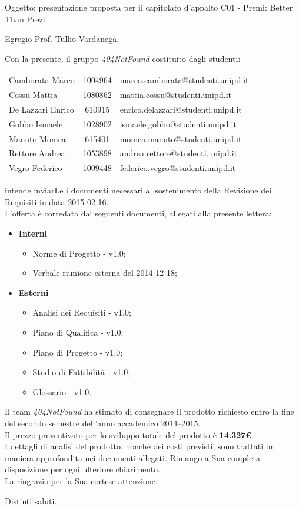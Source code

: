 \documentclass[a4paper,10pt]{letter}
\newcommand{\gruppo}{404NotFound}
\newcommand{\premi}{Premi: Better Than Prezi}
\newcommand{\Vardanega}{Prof. Tullio Vardanega}
\newcommand{\VeFe}{Vegro Federico}
\newcommand{\CaMa}{Camborata Marco}
\newcommand{\GoIs}{Gobbo Ismaele}
\newcommand{\DeEn}{De Lazzari Enrico}
\newcommand{\CoMa}{Cossu Mattia}
\newcommand{\ReAn}{Rettore Andrea}
\newcommand{\MaMo}{Manuto Monica}
\begin{document}
	
	\begin{letter}{Oggetto: presentazione proposta per il capitolato d'appalto  C01 - \premi.}
	\opening {Egregio \Vardanega ,}
	Con la presente, il gruppo \textit{\gruppo} costituito dagli studenti: 
		\begin{center}
		\begin{tabular}{l c l c}					
		\CaMa & 1004964 & marco.camborata@studenti.unipd.it \\
		\CoMa & 1080862 & mattia.cossu@studenti.unipd.it\\
		\DeEn & 610915  & enrico.delazzari@studenti.unipd.it\\ 
		\GoIs & 1028902 & ismaele.gobbo@studenti.unipd.it\\
		\MaMo & 615401  & monica.manuto@studenti.unipd.it\\
		\ReAn & 1053898 & andrea.rettore@studenti.unipd.it\\
		\VeFe & 1009448 & federico.vegro@studenti.unipd.it\\
		\end{tabular}
		\end{center}
	intende inviarLe i documenti necessari al sostenimento della Revisione dei Requisiti in data 2015-02-16.\\
    L'offerta è corredata dai seguenti documenti, allegati alla presente lettera:
			\begin{itemize}
				\item \textbf{Interni}
					\begin{itemize}
						\item Norme di Progetto - v1.0;
						\item Verbale riunione esterna del 2014-12-18;
					\end{itemize}
				\item \textbf{Esterni}
					\begin{itemize}
						\item Analisi dei Requisiti - v1.0;
						\item Piano di Qualifica - v1.0;
						\item Piano di Progetto - v1.0;
						\item Studio di Fattibilità - v1.0;
						\item Glossario - v1.0.
					\end{itemize}
			\end{itemize} 
		Il team \textit{\gruppo} ha stimato di consegnare il prodotto richiesto entro la fine del secondo semestre dell'anno accademico 2014–2015.\\
		Il prezzo preventivato per lo sviluppo totale del prodotto è \textbf{14.327\euro}. \\ 
		I dettagli di analisi del prodotto, nonché dei costi previsti, sono trattati in maniera approfondita nei documenti allegati. Rimango a Sua completa disposizione per ogni ulteriore chiarimento.\\ La ringrazio per la Sua cortese attenzione.
\thispagestyle{fancy}
\closing{Distinti saluti.}
   \end{letter}
\end{document}
